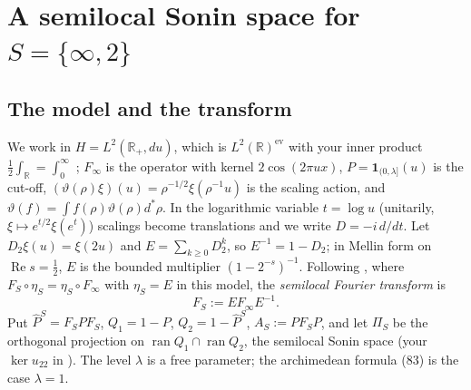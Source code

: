 \documentclass[11pt]{amsart}
\theoremstyle{definition}
\theoremstyle{remark}
\newcommand{\R}{\mathbb R}
\newcommand{\Rel}{\operatorname{Re}}
\newcommand{\ran}{\operatorname{ran}}
\newcommand{\Pih}{\widehat P}
\begin{document}
\section{A semilocal Sonin space for $S=\{\infty,2\}$}\label{sec:semilocal}

\subsection{The model and the transform}
We work in $H=L^2(\R_+,du)$, which is $L^2(\R)^{\mathrm{ev}}$ with your inner product $\frac12\int_\R=\int_0^\infty$
\cite[(16)]{CC2021}; $F_\infty$ is the operator with kernel $2\cos(2\pi ux)$, $P=\mathbf 1_{(0,\lambda]}(u)$ is the cut-off,
$(\vartheta(\rho)\xi)(u)=\rho^{-1/2}\xi(\rho^{-1}u)$ is the scaling action, and $\vartheta(f)=\int f(\rho)\vartheta(\rho)d^*\rho$.
In the logarithmic variable $t=\log u$ (unitarily, $\xi\mapsto e^{t/2}\xi(e^t)$) scalings become translations and we write
$D=-i\,d/dt$. Let $D_2\xi(u)=\xi(2u)$ and $E=\sum_{k\ge0}D_2^k$, so $E^{-1}=1-D_2$; in Mellin form on $\Rel s=\frac12$,
$E$ is the bounded multiplier $(1-2^{-s})^{-1}$. Following \cite[Prop.~4.1]{CCM2023}, where $F_S\circ\eta_S=\eta_S\circ F_\infty$
with $\eta_S=E$ in this model, the \emph{semilocal Fourier transform} is
\[
F_S:=EF_\infty E^{-1}.
\]
Put $\Pih^S=F_SPF_S$, $Q_1=1-P$, $Q_2=1-\Pih^S$, $A_S:=PF_SP$, and let $\Pi_S$ be the orthogonal projection on
$\ran Q_1\cap\ran Q_2$, the semilocal Sonin space (your $\ker u_{22}$ in \cite{CCquasi}). The level $\lambda$ is a free
parameter; the archimedean formula (83) is the case $\lambda=1$.
\end{document}
